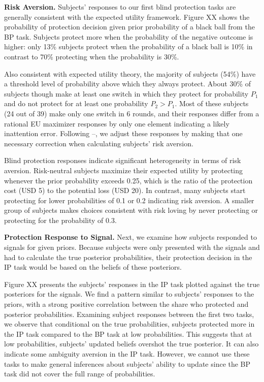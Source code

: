 \documentclass[12pt,a4paper]{article}
\begin{document}
\textbf{Risk Aversion.} Subjects’ responses to our first blind protection tasks are generally consistent with the expected utility framework. Figure XX shows the probability of protection decision given prior probability of a black ball from the BP task. Subjects protect more when the probability of the negative outcome is higher: only 13\% subjects protect when the probability of a black ball is 10\% in contrast to 70\% protecting when the probability is 30\%. 

Also consistent with expected utility theory, the majority of subjects (54\%) have a threshold level of probability above which they always protect. About 30\% of subjects though make at least one switch in which they protect for probability $P_1$ and do not protect for at least one probability $P_2>P_1$. Most of these subjects (24 out of 39) make only one switch in 6 rounds, and their responses differ from a rational EU maximizer responses by only one element  indicating a likely inattention error. Following –, we adjust these responses by making that one necessary correction when calculating subjects’ risk aversion. 

Blind protection responses indicate significant heterogeneity in terms of risk aversion. Risk-neutral subjects maximize their expected utility by protecting whenever the prior probability exceeds 0.25, which is the ratio of the protection cost (USD 5) to the potential loss (USD 20). In contrast, many subjects start protecting for lower probabilities of 0.1 or 0.2 indicating risk aversion. A smaller group of subjects makes choices consistent with risk loving by never protecting or protecting for the probability of 0.3. 

\textbf{Protection Response to Signal.} Next, we examine how subjects responded to signals for given priors. Because subjects were only presented with the signals and had to calculate the true posterior probabilities, their protection decision in the IP task would be based on the beliefs of these posteriors. 

Figure XX presents the subjects’ responses in the IP task plotted against the true posteriors for the signals.    We find a pattern similar to subjects’ responses to the priors, with a strong positive correlation between the share who protected and posterior probabilities. Examining subject responses between the first two tasks, we observe that conditional on the true probabilities, subjects protected more in the IP task compared to the BP task at low probabilities. This suggests that at low probabilities, subjects’ updated beliefs overshot the true posterior. It can also indicate some ambiguity aversion in the IP task. However, we cannot use these tasks to make general inferences about subjects’ ability to update since the BP task did not cover the full range of probabilities.
\end{document}
